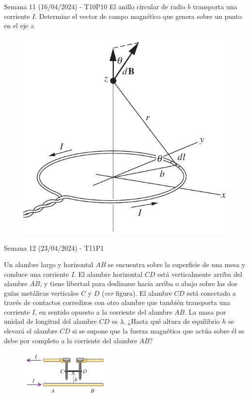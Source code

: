 \begin{frame}{Semana 11 (16/04/2024) - T10P10}
    El anillo circular de radio $b$ transporta una corriente $I$. Determine el vector de campo magnético que genera sobre un punto en el eje $z$.

    \begin{figure}
        \centering
        \includegraphics[scale=0.3]{figures/t10p10.png}
    \end{figure}
        \end{frame}

\begin{frame}{Semana 12 (23/04/2024) - T11P1}

    Un alambre largo y horizontal $AB$ se encuentra sobre la
superficie de una mesa y conduce
una corriente $I$. El alambre horizontal $CD$ está verticalmente
arriba del alambre $AB$, y tiene
libertad para deslizarse hacia
arriba o abajo sobre las dos guías metálicas verticales $C$ y $D$ (\textit{ver} figura). El alambre $CD$ está conectado a través de contactos corredizos con otro alambre que también transporta una corriente $I$, en sentido
opuesto a la corriente del alambre $AB$. La masa por unidad de longitud
del alambre $CD$ es $\lambda$. ¿Hasta qué altura de equilibrio $h$ se elevará el
alambre $CD$ si se supone que la fuerza magnética que actúa sobre él se
debe por completo a la corriente del alambre $AB$?

\begin{figure}
    \centering
    \includegraphics[width=0.4\textwidth]{figures/t11p1.png}
\end{figure}

\end{frame}

